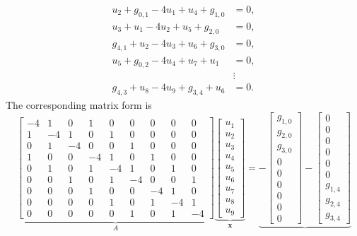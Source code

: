 \[\begin{aligned}
u_2+g_{0,1}-4u_1+u_4+g_{1,0}&=0,\\
u_3+u_1-4u_2+u_5+g_{2,0}&=0,\\
g_{4,1}+u_2-4u_3+u_6+g_{3,0}&=0,\\
u_5+g_{0,2}-4u_4+u_7+u_1&=0,\\
&\vdots\\
g_{4,3}+u_8-4u_9+g_{3,4}+u_6&=0.
\end{aligned}\]
{The corresponding matrix form is}
\begin{equation}\label{eq:laplace-grid-system}
\underbrace{\left[\begin{array}{rrr|rrr|rrr}
-4&1&0&1&0&0&0&0&0\\1&-4&1&0&1&0&0&0&0\\0&1&-4&0&0&1&0&0&0\\\hline
1&0&0&-4&1&0&1&0&0\\0&1&0&1&-4&1&0&1&0\\0&0&1&0&1&-4&0&0&1\\\hline
0&0&0&1&0&0&-4&1&0\\0&0&0&0&1&0&1&-4&1\\0&0&0&0&0&1&0&1&-4
\end{array}\right]}_A
\underbrace{\begin{bmatrix}u_1\\u_2\\u_3\\u_4\\u_5\\u_6\\u_7\\u_8\\u_9\end{bmatrix}}_{\boldsymbol{x}}
=\underbrace{-\begin{bmatrix}g_{1,0}\\g_{2,0}\\g_{3,0}\\0\\0\\0\\0\\0\\0\end{bmatrix}
-\begin{bmatrix}0\\0\\0\\0\\0\\0\\g_{1,4}\\g_{2,4}\\g_{3,4}\end{bmatrix}
}
\end{equation}

